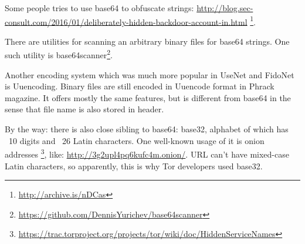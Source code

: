 Some people tries to use base64 to obfuscate strings:
\url{http://blog.sec-consult.com/2016/01/deliberately-hidden-backdoor-account-in.html}
\footnote{\url{http://archive.is/nDCas}}.

There are utilities for scanning an arbitrary binary files for base64 strings.
One such utility is base64scanner\footnote{\url{https://github.com/DennisYurichev/base64scanner}}.

Another encoding system which was much more popular in UseNet and FidoNet is Uuencoding.
Binary files are still encoded in Uuencode format in Phrack magazine.
It offers mostly the same features, but is different from base64 in the sense that file name
is also stored in header.

By the way: there is also close sibling to base64: base32, alphabet of which has ~10 digits and ~26 Latin characters.
One well-known usage of it is onion addresses
\footnote{\url{https://trac.torproject.org/projects/tor/wiki/doc/HiddenServiceNames}},
like: \url{http://3g2upl4pq6kufc4m.onion/}.
\ac{URL} can't have mixed-case Latin characters, so apparently, this is why Tor developers used base32.

